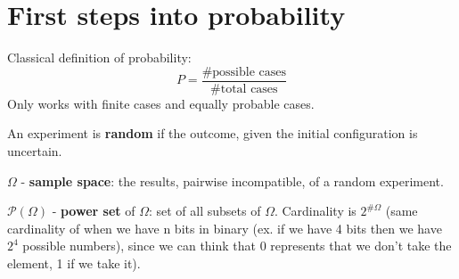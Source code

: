 \chapter{First steps into probability}
Classical definition of probability:
\begin{equation*}
    P=\frac{\text{\#possible cases}}{\text{\#total cases}}
\end{equation*}
Only works with finite cases and equally probable cases.
\begin{definition}
An experiment is \textbf{random} if the outcome, given the initial configuration is uncertain.
\end{definition}
\begin{definition}
    $\Omega$ - \textbf{sample space}: the results, pairwise incompatible, of a random experiment.
\end{definition}
\begin{definition}
    $ \mathcal{P}(\Omega) $ - \textbf{power set} of $\Omega$: set of all subsets of $\Omega$. Cardinality is $ 2^{\#\Omega} $ (same cardinality of when we have n bits in binary (ex. if we have 4 bits then we have $2^4$ possible numbers), since we can think that 0 represents that we don't take the element, 1 if we take it).
\end{definition}
